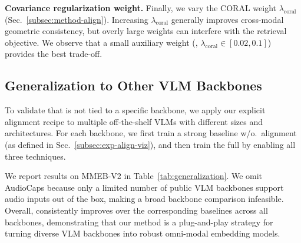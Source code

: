 \noindent\textbf{Covariance regularization weight.}
Finally, we vary the CORAL weight $\lambda_{\mathrm{coral}}$ (Sec.~\ref{subsec:method-align}).
Increasing $\lambda_{\mathrm{coral}}$ generally improves cross-modal geometric consistency, but overly large weights can interfere with the retrieval objective.
We observe that a small auxiliary weight (\eg, $\lambda_{\mathrm{coral}}\in[0.02,0.1]$) provides the best trade-off.





\subsection{Generalization to Other VLM Backbones}
\label{subsec:generalization}

To validate that \ours{} is not tied to a specific backbone, we apply our explicit alignment recipe to multiple off-the-shelf VLMs with different sizes and architectures.
For each backbone, we first train a strong baseline w/o.\ alignment (as defined in Sec.~\ref{subsec:exp-align-viz}), and then train the full \ours{} by enabling all three techniques.

We report results on MMEB-V2 in Table~\ref{tab:generalization}.
We omit AudioCaps because only a limited number of public VLM backbones support audio inputs out of the box, making a broad backbone comparison infeasible.
Overall, \ours{} consistently improves over the corresponding baselines across all backbones, demonstrating that our method is a plug-and-play strategy for turning diverse VLM backbones into robust omni-modal embedding models.




